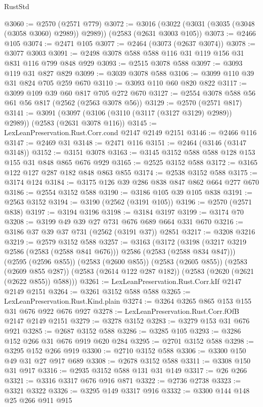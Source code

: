 \begin{lexlean}{RustStd}
\begin{coremodule}
@3060 := @2570 (@2571 @779)
@3072 := @3016 (@3022 (@3031 (@3035 (@3048 (@3058 @3060) @2989)) @2989)) (@2583 (@2631 @3003 @105))
@3073 := @2466 @105
@3074 := @2471 @105
@3077 := @2464 (@3073 (@2637 @3074))
@3078 := @3077 @3003
@3091 := @2498 @3078 @588 @588 @116 @31 @119 @156 @31 @831 @116 @799 @848 @929
@3093 := @2515 @3078 @588
@3097 := @3093 @119 @31 @827 @829
@3099 := @3039 @3078 @588
@3106 := @3099 @110 @39 @31 @824 @705 @259 @670
@3110 := @3093 @110 @60 @820 @822
@3117 := @3099 @109 @39 @60 @817 @705 @272 @670
@3127 := @2554 @3078 @588 @56 @61 @56 @817 (@2562 (@2563 @3078 @56))
@3129 := @2570 (@2571 @817)
@3141 := @3091 (@3097 (@3106 (@3110 (@3117 (@3127 @3129) @2989)) @2989)) (@2583 (@2631 @3078 @116))
@3145 := LexLeanPreservation.Rust.Corr.cond @2147 @2149 @2151
@3146 := @2466 @116
@3147 := @2469 @31
@3148 := @2471 @116
@3151 := @2464 (@3146 (@3147 @3148))
@3152 := @3151 @3078
@3163 := @3145 @3152 @588 @588 @128 @153 @155 @31 @848 @865 @676 @929
@3165 := @2525 @3152 @588
@3172 := @3165 @122 @127 @287 @182 @848 @863 @855
@3174 := @2538 @3152 @588
@3175 := @3174 @124
@3184 := @3175 @126 @39 @286 @838 @847 @862 @664 @277 @670
@3186 := @2554 @3152 @588
@3190 := @3186 @105 @39 @105 @838
@3191 := @2563 @3152
@3194 := @3190 (@2562 (@3191 @105))
@3196 := @2570 (@2571 @838)
@3197 := @3194 @3196
@3198 := @3184 @3197
@3199 := @3174 @70
@3208 := @3199 @49 @39 @27 @731 @676 @689 @664 @331 @670
@3216 := @3186 @37 @39 @37 @731 (@2562 (@3191 @37)) @2851
@3217 := @3208 @3216
@3219 := @2579 @3152 @588
@3257 := @3163
    (@3172
      (@3198 (@3217 @3219 @2586 (@2583 (@2588 @841 @676))) @2586 (@2583 (@2588 @834 @847)))
      (@2595 (@2596 @855))
      (@2583 (@2600 @855))
      (@2583 (@2605 @855))
      (@2583 (@2609 @855 @287))
      (@2583 (@2614 @122 @287 @182))
      (@2583 (@2620 (@2621 (@2622 @855)) @588)))
@3261 := LexLeanPreservation.Rust.Corr.kIf @2147 @2149 @2151
@3264 := @3261 @3152 @588 @588
@3265 := LexLeanPreservation.Rust.Kind.plain
@3274 := @3264 @3265 @865 @153 @155 @31 @676 @922 @676 @927
@3278 := LexLeanPreservation.Rust.Corr.fOfB @2147 @2149 @2151
@3279 := @3278 @3152
@3283 := @3279 @153 @31 @676 @921
@3285 := @2687 @3152 @588
@3286 := @3285 @105
@3293 := @3286 @152 @266 @31 @676 @919 @620 @284
@3295 := @2701 @3152 @588
@3298 := @3295 @152 @266 @919
@3300 := @2710 @3152 @588
@3306 := @3300 @150 @49 @31 @27 @917 @689
@3308 := @2678 @3152 @588
@3311 := @3308 @150 @31 @917
@3316 := @2935 @3152 @588 @131 @31 @149
@3317 := @26 @266
@3321 := @3316 @3317 @676 @916 @871
@3322 := @2736 @2738
@3323 := @3321 @3322
@3326 := @3295 @149 @3317 @916
@3332 := @3300 @144 @148 @25 @266 @911 @915

\end{coremodule}
\end{lexlean}
